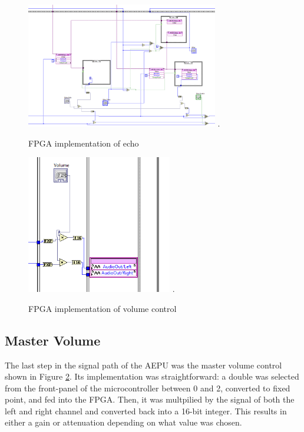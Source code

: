 \begin{figure}[!t]
\centering
\includegraphics[width=3.3in]{echo.png}
\DeclareGraphicsExtensions.
\caption{FPGA implementation of echo}
\label{fig_echo}
\end{figure} 

\begin{figure}[!t]
\centering
\includegraphics[width=2.5in]{volume.png}
\DeclareGraphicsExtensions.
\caption{FPGA implementation of volume control}
\label{fig_volume}
\end{figure} 

\subsection{Master Volume}

The last step in the signal path of the AEPU was the master volume control shown in Figure \ref{fig_volume}.
Its implementation was straightforward: a double was selected from the front-panel of the microcontroller between 0 and 2, converted to fixed point, and fed into the FPGA.
Then, it was multpilied by the signal of both the left and right channel and converted back into a 16-bit integer.
This results in either a gain or attenuation depending on what value was chosen.

